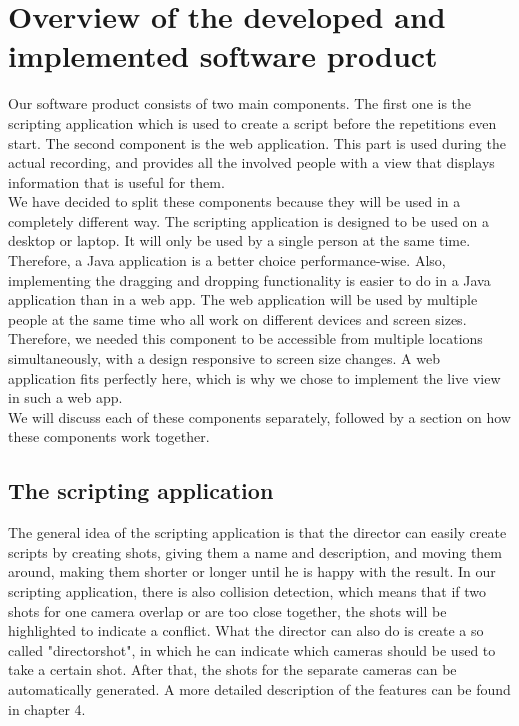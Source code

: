 \section{Overview of the developed and implemented software product}

Our software product consists of two main components. The first one is the scripting application which is used to create a script before the repetitions even start. The second component is the web application. This part is used during the actual recording, and provides all the involved people with a view that displays information that is useful for them.\\
 We have decided to split these components because they will be used in a completely different way. The scripting application is designed to be used on a desktop or laptop. It will only be used by a single person at the same time. Therefore, a Java application is a better choice performance-wise. Also, implementing the dragging and dropping functionality is easier to do in a Java application than in a web app. The web application will be used by multiple people at the same time who all work on different devices and screen sizes. Therefore, we needed this component to be accessible from multiple locations simultaneously, with a design responsive to screen size changes. A web application fits perfectly here, which is why we chose to implement the live view in such a web app.\\
We will discuss each of these components separately, followed by a section on how these components work together.

\subsection{The scripting application}
The general idea of the scripting application is that the director can easily create scripts by creating shots, giving them a name and description, and moving them around, making them shorter or longer until he is happy with the result. In our scripting application, there is also collision detection, which means that if two shots for one camera overlap or are too close together, the shots will be highlighted to indicate a conflict. What the director can also do is create a so called "directorshot", in which he can indicate which cameras should be used to take a certain shot. After that, the shots for the separate cameras can be automatically generated. A more detailed description of the features can be found in chapter 4.

